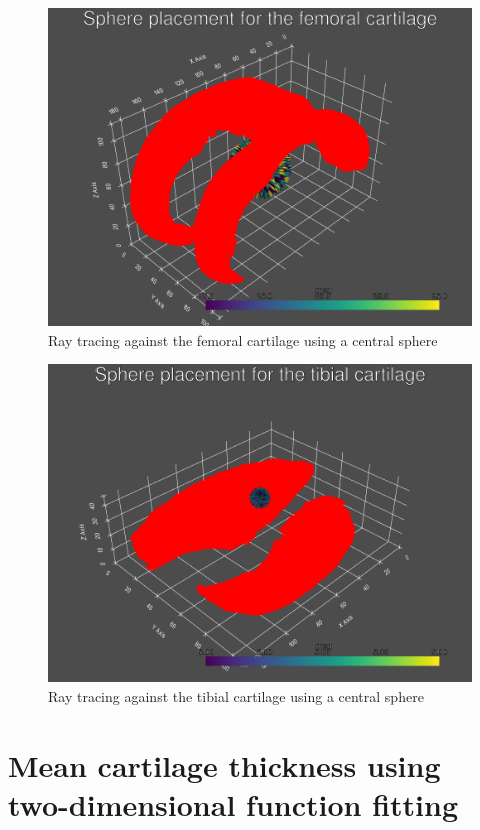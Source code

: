 \begin{figure}[]
	\centering
	\includegraphics[width=\linewidth]{./figures/femoral_sphere}
	\caption{Ray tracing against the femoral cartilage using a central sphere}
	\label{fig:femoral_sphere}
\end{figure}

\begin{figure}[]
	\centering
	\includegraphics[width=\linewidth]{./figures/tibial_sphere}
	\caption{Ray tracing against the tibial cartilage using a central sphere}
	\label{fig:tibial_sphere}
\end{figure}

\section{Mean cartilage thickness using two-dimensional function fitting}
\label{sec:Function_fitting}
